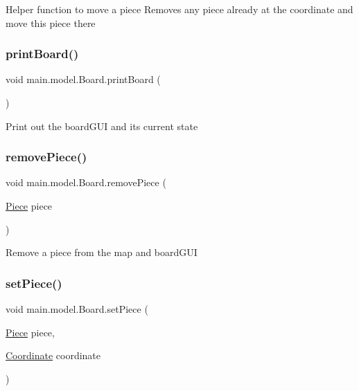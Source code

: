 Helper function to move a piece Removes any piece already at the coordinate and move this piece there \hypertarget{classmain_1_1model_1_1_board_ae838db532812c97d60e76ecd58027cc9}{}\label{classmain_1_1model_1_1_board_ae838db532812c97d60e76ecd58027cc9} 
\subsubsection{\texorpdfstring{print\+Board()}{printBoard()}}
{\footnotesize\ttfamily void main.\+model.\+Board.\+print\+Board (\begin{DoxyParamCaption}{ }\end{DoxyParamCaption})}

Print out the board\+G\+UI and its current state \hypertarget{classmain_1_1model_1_1_board_a267a2fd3d08cb25c4d35ceb9c61e5402}{}\label{classmain_1_1model_1_1_board_a267a2fd3d08cb25c4d35ceb9c61e5402} 
\subsubsection{\texorpdfstring{remove\+Piece()}{removePiece()}}
{\footnotesize\ttfamily void main.\+model.\+Board.\+remove\+Piece (\begin{DoxyParamCaption}\item[{\hyperlink{classmain_1_1pieces_1_1_piece}{Piece}}]{piece }\end{DoxyParamCaption})}

Remove a piece from the map and board\+G\+UI \hypertarget{classmain_1_1model_1_1_board_ac89ac2b16c2e7ed3e0ff9160b471d99c}{}\label{classmain_1_1model_1_1_board_ac89ac2b16c2e7ed3e0ff9160b471d99c} 
\subsubsection{\texorpdfstring{set\+Piece()}{setPiece()}\hspace{0.1cm}{\footnotesize\ttfamily [1/2]}}
{\footnotesize\ttfamily void main.\+model.\+Board.\+set\+Piece (\begin{DoxyParamCaption}\item[{\hyperlink{classmain_1_1pieces_1_1_piece}{Piece}}]{piece,  }\item[{\hyperlink{classmain_1_1model_1_1_coordinate}{Coordinate}}]{coordinate }\end{DoxyParamCaption})}

